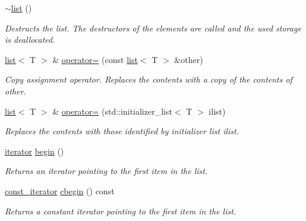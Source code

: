 \begin{DoxyCompactItemize}
\mbox{\label{classls_1_1list_ab341963c62740c4e4d1a042fdba9c856}} 
\hyperlink{classls_1_1list_ab341963c62740c4e4d1a042fdba9c856}{$\sim$list} ()
\begin{DoxyCompactList}\small\item\em Destructs the list. The destructors of the elements are called and the used storage is deallocated. \end{DoxyCompactList}\item 
\mbox{\label{classls_1_1list_aa447eb049c1c13b2846aba8689b875af}} 
\hyperlink{classls_1_1list}{list}$<$ T $>$ \& \hyperlink{classls_1_1list_aa447eb049c1c13b2846aba8689b875af}{operator=} (const \hyperlink{classls_1_1list}{list}$<$ T $>$ \&other)
\begin{DoxyCompactList}\small\item\em Copy assignment operator. Replaces the contents with a copy of the contents of other. \end{DoxyCompactList}\item 
\mbox{\label{classls_1_1list_a87472ac420c9de170637cb35aefbde8c}} 
\hyperlink{classls_1_1list}{list}$<$ T $>$ \& \hyperlink{classls_1_1list_a87472ac420c9de170637cb35aefbde8c}{operator=} (std\+::initializer\+\_\+list$<$ T $>$ ilist)
\begin{DoxyCompactList}\small\item\em Replaces the contents with those identified by initializer list ilist. \end{DoxyCompactList}\item 
\mbox{\label{classls_1_1list_a73458e8145cc3ee958fb59940084ab61}} 
\hyperlink{classls_1_1list_af036cf72da26107a5084c1e4b45b9cb7}{iterator} \hyperlink{classls_1_1list_a73458e8145cc3ee958fb59940084ab61}{begin} ()
\begin{DoxyCompactList}\small\item\em Returns an iterator pointing to the first item in the list. \end{DoxyCompactList}\item 
\mbox{\label{classls_1_1list_a0c168cf2301ed80e1a853827d366294a}} 
\hyperlink{classls_1_1list_ad543276e86075caadf97ae64f2fc7cfc}{const\+\_\+iterator} \hyperlink{classls_1_1list_a0c168cf2301ed80e1a853827d366294a}{cbegin} () const
\begin{DoxyCompactList}\small\item\em Returns a constant iterator pointing to the first item in the list. \end{DoxyCompactList}\item 

\end{DoxyCompactItemize}
